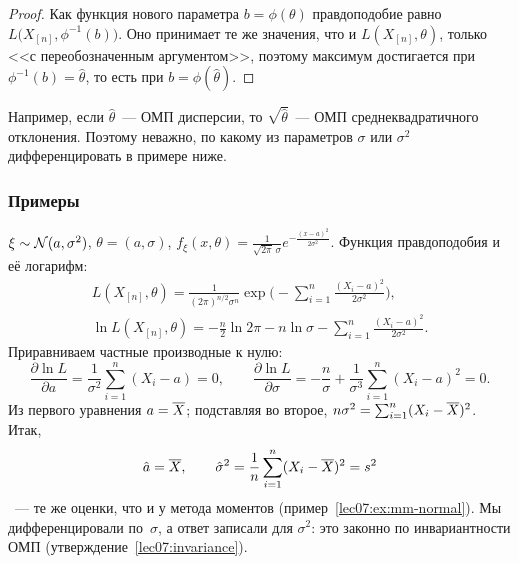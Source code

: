 \begin{proof}
  Как функция нового параметра $b = \phi(\theta)$ правдоподобие равно
  $L\bigl(X_{[n]}, \phi^{-1}(b)\bigr)$. Оно принимает те же значения, что и
  $L(X_{[n]}, \theta)$, только <<с переобозначенным аргументом>>, поэтому максимум
  достигается при $\phi^{-1}(b) = \hat\theta$, то есть при $b = \phi(\hat\theta)$.
\end{proof}

Например, если $\hat\theta$~--- ОМП дисперсии, то $\sqrt{\hat\theta}$~--- ОМП среднеквадратичного
отклонения. Поэтому неважно, по какому из параметров $\sigma$ или $\sigma^2$ дифференцировать
в примере ниже.

\subsubsection{Примеры}

\begin{example}
  \label{lec07:ex:mle-normal}
  $\xi \sim \mathcal{N}(a, \sigma^2)$, $\theta = (a, \sigma)$,
  $f_\xi(x, \theta) = \frac{1}{\sqrt{2\pi}\,\sigma} e^{-\frac{(x - a)^2}{2\sigma^2}}$.
  Функция правдоподобия и её логарифм:
  \begin{gather*}
    L(X_{[n]}, \theta) = \frac{1}{(2\pi)^{n/2} \sigma^n}
                         \exp\biggl(-\sum_{i=1}^n \frac{(X_i - a)^2}{2\sigma^2}\biggr), \\
    \ln L(X_{[n]}, \theta) = -\frac n2 \ln 2\pi - n \ln\sigma
                             - \sum_{i=1}^n \frac{(X_i - a)^2}{2\sigma^2}.
  \end{gather*}
  Приравниваем частные производные к нулю:
  \[
    \frac{\partial \ln L}{\partial a} = \frac{1}{\sigma^2} \sum_{i=1}^n (X_i - a) = 0,
    \qquad
    \frac{\partial \ln L}{\partial \sigma} = -\frac{n}{\sigma}
      + \frac{1}{\sigma^3} \sum_{i=1}^n (X_i - a)^2 = 0.
  \]
  Из первого уравнения $a = \overline{X}$; подставляя во второе, $n\sigma^2 = \sum_{i=1}^n (X_i - \overline{X})^2$.
  Итак,
  \[
    \hat a = \overline{X}, \qquad \hat\sigma^2 = \frac1n \sum_{i=1}^n (X_i - \overline{X})^2 = s^2
  \]
  ~--- те же оценки, что и у метода моментов (пример~\ref{lec07:ex:mm-normal}).
  Мы дифференцировали по~$\sigma$, а ответ записали для $\sigma^2$: это законно по
  инвариантности ОМП (утверждение~\ref{lec07:invariance}).
\end{example}

